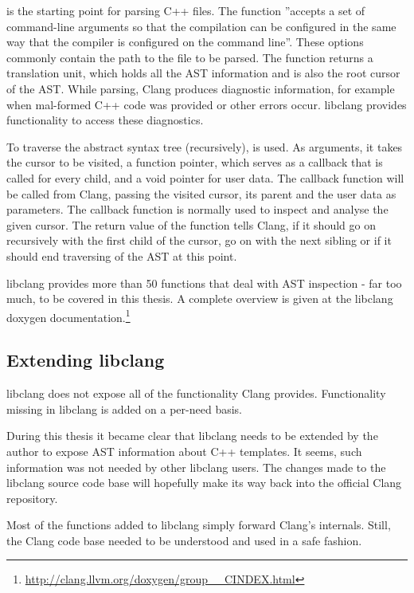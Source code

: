  is the starting point for parsing C++ files. The function ''accepts a set of command-line arguments so that the compilation can be configured in the same way that the compiler is configured on the command line''. These options commonly contain the path to the file to be parsed. The function returns a translation unit, which holds all the AST information and is also the root cursor of the AST. While parsing, Clang produces diagnostic information, for example when mal-formed C++ code was provided or other errors occur. libclang provides functionality to access these diagnostics.

To traverse the abstract syntax tree (recursively),  is used. As arguments, it takes the cursor to be visited, a function pointer, which serves as a callback that is called for every child, and a void pointer for user data. The callback function will be called from Clang, passing the visited cursor, its parent and the user data as parameters. The callback function is normally used to inspect and analyse the given cursor. The return value of the function tells Clang, if it should go on recursively with the first child of the cursor, go on with the next sibling or if it should end traversing of the AST at this point.

libclang provides more than 50 functions that deal with AST inspection - far too much, to be covered in this thesis. A complete overview is given at the libclang doxygen documentation.\footnote{\url{http://clang.llvm.org/doxygen/group\_\_CINDEX.html}}

\subsection{Extending libclang}

libclang does not expose all of the functionality Clang provides. Functionality missing in libclang is added on a per-need basis. 

During this thesis it became clear that libclang needs to be extended by the author to expose AST information about C++ templates. It seems, such information was not needed by other libclang users. The changes made to the libclang source code base will hopefully make its way back into the official Clang repository.

Most of the functions added to libclang simply forward Clang's internals. Still, the Clang code base needed to be understood and used in a safe fashion.

